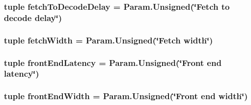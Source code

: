 \label{classOzoneCPU_1_1DerivOzoneCPU_a5257b644f11c5f2c70417ef15932fb77}
\hypertarget{classOzoneCPU_1_1DerivOzoneCPU_a10e1e587508ee15562df112d1142b851}{
\subsubsection[{fetchToDecodeDelay}]{\setlength{\rightskip}{0pt plus 5cm}tuple {\bf fetchToDecodeDelay} = Param.Unsigned(\char`\"{}Fetch to decode delay\char`\"{})}}
\label{classOzoneCPU_1_1DerivOzoneCPU_a10e1e587508ee15562df112d1142b851}
\hypertarget{classOzoneCPU_1_1DerivOzoneCPU_a0a9358767ec7c9dfef70564672b53522}{
\subsubsection[{fetchWidth}]{\setlength{\rightskip}{0pt plus 5cm}tuple {\bf fetchWidth} = Param.Unsigned(\char`\"{}Fetch {\bf width}\char`\"{})}}
\label{classOzoneCPU_1_1DerivOzoneCPU_a0a9358767ec7c9dfef70564672b53522}
\hypertarget{classOzoneCPU_1_1DerivOzoneCPU_abd7ffc4273c1209f8030454ead0b8c3e}{
\subsubsection[{frontEndLatency}]{\setlength{\rightskip}{0pt plus 5cm}tuple {\bf frontEndLatency} = Param.Unsigned(\char`\"{}Front end latency\char`\"{})}}
\label{classOzoneCPU_1_1DerivOzoneCPU_abd7ffc4273c1209f8030454ead0b8c3e}
\hypertarget{classOzoneCPU_1_1DerivOzoneCPU_a37bf0791ba0c000a4576f8a57e81a9ee}{
\subsubsection[{frontEndWidth}]{\setlength{\rightskip}{0pt plus 5cm}tuple {\bf frontEndWidth} = Param.Unsigned(\char`\"{}Front end {\bf width}\char`\"{})}}
